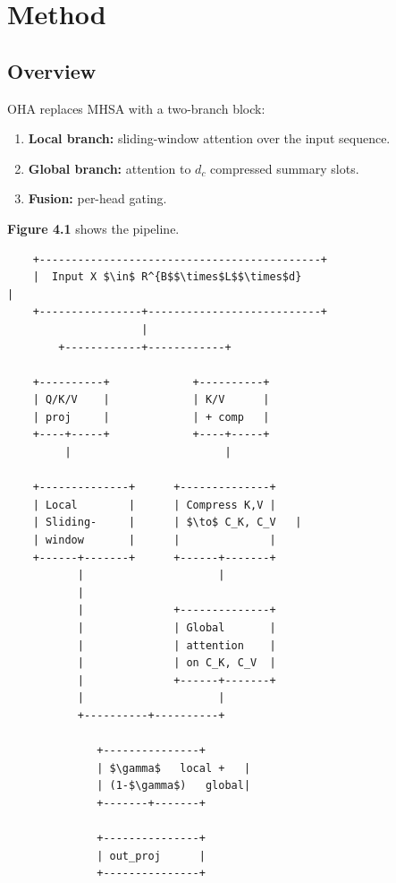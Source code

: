 
\section{Method}

\subsection{Overview}

OHA replaces MHSA with a two-branch block:

\begin{enumerate}
\item \textbf{Local branch:} sliding-window attention over the input sequence.
\item \textbf{Global branch:} attention to $d_c$ compressed summary slots.
\item \textbf{Fusion:} per-head gating.

\end{enumerate}
\textbf{Figure 4.1} shows the pipeline.

\begin{lstlisting}
    +--------------------------------------------+
    |  Input X $\in$ R^{B$$\times$L$$\times$d}                        |
    +----------------+---------------------------+
                     |
        +------------+------------+
                                   
    +----------+             +----------+
    | Q/K/V    |             | K/V      |
    | proj     |             | + comp   |
    +----+-----+             +----+-----+
         |                        |
                                   
    +--------------+      +--------------+
    | Local        |      | Compress K,V |
    | Sliding-     |      | $\to$ C_K, C_V   |
    | window       |      |              |
    +------+-------+      +------+-------+
           |                     |
           |                      
           |              +--------------+
           |              | Global       |
           |              | attention    |
           |              | on C_K, C_V  |
           |              +------+-------+
           |                     |
           +----------+----------+
                       
              +---------------+
              | $\gamma$   local +   |
              | (1-$\gamma$)   global|
              +-------+-------+
                       
              +---------------+
              | out_proj      |
              +---------------+
\end{lstlisting}

